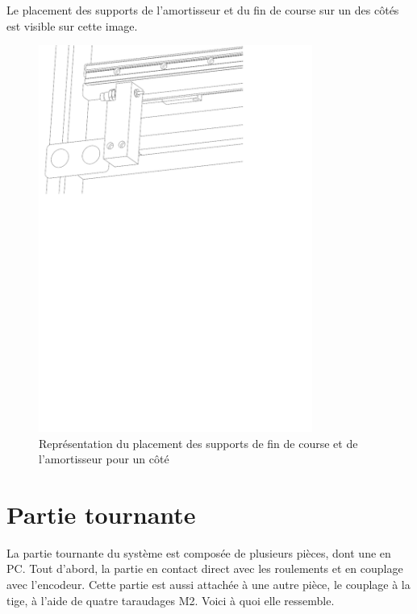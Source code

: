 Le placement des supports de l'amortisseur et du fin de course sur un des côtés est visible sur cette image.

\begin{figure}[H]
  \centering
  \includegraphics[width = 0.8\textwidth]{assets/figures/PlacementSupports.svg}
  \caption{Représentation du placement des supports de fin de course et de l'amortisseur pour un côté}
  \label{fig:PlaceSup}
\end{figure}

\section{Partie tournante}\label{sec:PartieTour}
La partie tournante du système est composée de plusieurs pièces, dont une en \acrshort{PC}. Tout d'abord, la partie en contact direct
avec les roulements et en couplage avec l'encodeur. Cette partie est aussi attachée à une autre pièce, le couplage à la tige, à l'aide de
quatre taraudages M2. Voici à quoi elle ressemble.

